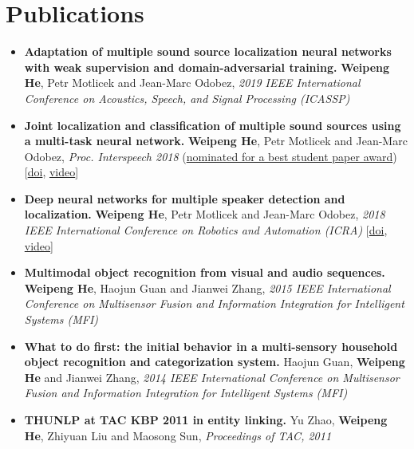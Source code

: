 \documentclass[a4paper,11pt]{article} %
\begin{document}
\section{Publications}
\begin{itemize}
  \item \textbf{Adaptation of multiple sound source localization neural networks with weak supervision and domain-adversarial training.}
    \textbf{Weipeng He}, Petr Motlicek and Jean-Marc Odobez,
    \textit{2019 IEEE International Conference on Acoustics, Speech, and Signal Processing (ICASSP)}

  \item \textbf{Joint localization and classification of multiple sound sources using a multi-task neural network.}
    \textbf{Weipeng He}, Petr Motlicek and Jean-Marc Odobez,
    \textit{Proc. Interspeech 2018}
    (\underline{nominated for a best student paper award})
    [\href{http://doi.org/10.21437/Interspeech.2018-1269}{doi}, \href{https://www.youtube.com/watch?v=O7bQvg03RTc}{video}]

  \item \textbf{Deep neural networks for multiple speaker detection and localization.}
    \textbf{Weipeng He}, Petr Motlicek and Jean-Marc Odobez,
    \textit{2018 IEEE International Conference on Robotics and Automation (ICRA)}
    [\href{http://doi.org/10.1109/ICRA.2018.8461267}{doi}, \href{https://www.youtube.com/watch?v=_4EwuVlE_pU}{video}]

  \item \textbf{Multimodal object recognition from visual and audio sequences.}
    \textbf{Weipeng He}, Haojun Guan and Jianwei Zhang,
    \textit{2015 IEEE International Conference on Multisensor Fusion and Information Integration for Intelligent Systems (MFI)}

  \item \textbf{What to do first: the initial behavior in a multi-sensory household object recognition and categorization system.}
    Haojun Guan, \textbf{Weipeng He} and Jianwei Zhang,
    \textit{2014 IEEE International Conference on Multisensor Fusion and Information Integration for Intelligent Systems (MFI)}

  \item \textbf{THUNLP at TAC KBP 2011 in entity linking.}
    Yu Zhao, \textbf{Weipeng He}, Zhiyuan Liu and Maosong Sun,
    \textit{Proceedings of TAC, 2011}
\end{itemize}

\end{document}
